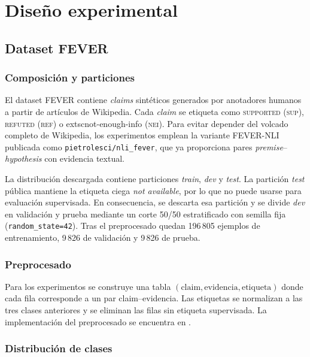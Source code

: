 \chapter{Diseño experimental}\label{cap:diseno}

\section{Dataset FEVER}

\subsection{Composición y particiones}

El dataset FEVER \citep{thorne2018fever} contiene \emph{claims}
sintéticos generados por anotadores humanos a partir de artículos de
Wikipedia. Cada \emph{claim} se etiqueta como \textsc{supported}
(\textsc{sup}), \textsc{refuted} (\textsc{ref}) o
	extsc{not-enough-info} (\textsc{nei}). Para evitar depender del
volcado completo de Wikipedia, los experimentos emplean la variante
FEVER-NLI publicada como \texttt{pietrolesci/nli\_fever}, que ya
proporciona pares \emph{premise}--\emph{hypothesis} con evidencia
textual.

La distribución descargada contiene particiones \emph{train},
\emph{dev} y \emph{test}. La partición \emph{test} pública mantiene la
etiqueta ciega \emph{not available}, por lo que no puede usarse para
evaluación supervisada. En consecuencia, se descarta esa partición y se
divide \emph{dev} en validación y prueba mediante un corte 50/50
estratificado con semilla fija (\texttt{random\_state=42}). Tras el
preprocesado quedan 196\,805 ejemplos de entrenamiento, 9\,826 de
validación y 9\,826 de prueba.

\subsection{Preprocesado}

Para los experimentos se construye una tabla
$(\text{claim}, \text{evidencia}, \text{etiqueta})$ donde cada fila
corresponde a un par claim--evidencia. Las etiquetas se normalizan a
las tres clases anteriores y se eliminan las filas sin etiqueta
supervisada. La implementación del preprocesado se encuentra en
.

\subsection{Distribución de clases}

